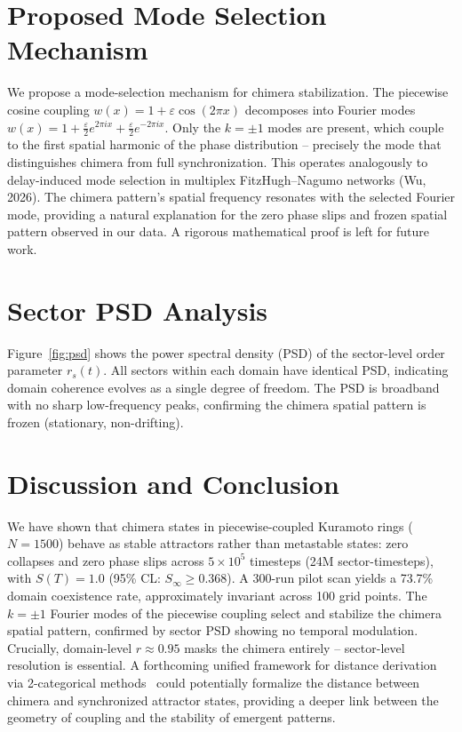 \documentclass[12pt]{article}
\newcommand{\eps}{\varepsilon}
\begin{document}
\section{Proposed Mode Selection Mechanism}\label{sec:mode-selection}

We propose a mode-selection mechanism for chimera stabilization. The piecewise cosine coupling $w(x) = 1 + \eps\cos(2\pi x)$ decomposes into Fourier modes $w(x) = 1 + \frac{\eps}{2}e^{2\pi i x} + \frac{\eps}{2}e^{-2\pi i x}$. Only the $k = \pm 1$ modes are present, which couple to the first spatial harmonic of the phase distribution -- precisely the mode that distinguishes chimera from full synchronization. This operates analogously to delay-induced mode selection in multiplex FitzHugh--Nagumo networks (Wu, 2026). The chimera pattern's spatial frequency resonates with the selected Fourier mode, providing a natural explanation for the zero phase slips and frozen spatial pattern observed in our data. A rigorous mathematical proof is left for future work.

\section{Sector PSD Analysis}\label{sec:psd}

Figure~\ref{fig:psd} shows the power spectral density (PSD) of the sector-level order parameter $r_s(t)$. All sectors within each domain have identical PSD, indicating domain coherence evolves as a single degree of freedom. The PSD is broadband with no sharp low-frequency peaks, confirming the chimera spatial pattern is frozen (stationary, non-drifting).

\section{Discussion and Conclusion}\label{sec:discussion}

We have shown that chimera states in piecewise-coupled Kuramoto rings ($N = 1500$) behave as stable attractors rather than metastable states: zero collapses and zero phase slips across $5\times 10^5$ timesteps (24M sector-timesteps), with $S(T) = 1.0$ (95\% CL: $S_\infty \geq 0.368$). A 300-run pilot scan yields a 73.7\% domain coexistence rate, approximately invariant across 100 grid points. The $k=\pm 1$ Fourier modes of the piecewise coupling select and stabilize the chimera spatial pattern, confirmed by sector PSD showing no temporal modulation. Crucially, domain-level $r \approx 0.95$ masks the chimera entirely -- sector-level resolution is essential. A forthcoming unified framework for distance derivation via 2-categorical methods~\cite{lu2026-distcat} could potentially formalize the distance between chimera and synchronized attractor states, providing a deeper link between the geometry of coupling and the stability of emergent patterns.
\end{document}
